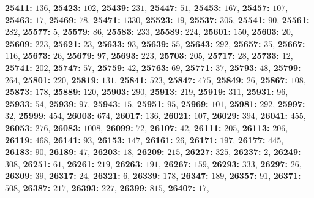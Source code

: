 \textsf{\bfseries 25411:} $136$, \textsf{\bfseries 25423:} $102$, \textsf{\bfseries 25439:} $231$, \textsf{\bfseries 25447:} $51$, \textsf{\bfseries 25453:} $167$, \textsf{\bfseries 25457:} $107$, \textsf{\bfseries 25463:} $17$, \textsf{\bfseries 25469:} $78$, \textsf{\bfseries 25471:} $1330$, \textsf{\bfseries 25523:} $19$, \textsf{\bfseries 25537:} $305$, \textsf{\bfseries 25541:} $90$, \textsf{\bfseries 25561:} $282$, \textsf{\bfseries 25577:} $5$, \textsf{\bfseries 25579:} $86$, \textsf{\bfseries 25583:} $233$, \textsf{\bfseries 25589:} $224$, \textsf{\bfseries 25601:} $150$, \textsf{\bfseries 25603:} $20$, \textsf{\bfseries 25609:} $223$, \textsf{\bfseries 25621:} $23$, \textsf{\bfseries 25633:} $93$, \textsf{\bfseries 25639:} $55$, \textsf{\bfseries 25643:} $292$, \textsf{\bfseries 25657:} $35$, \textsf{\bfseries 25667:} $116$, \textsf{\bfseries 25673:} $26$, \textsf{\bfseries 25679:} $97$, \textsf{\bfseries 25693:} $223$, \textsf{\bfseries 25703:} $205$, \textsf{\bfseries 25717:} $28$, \textsf{\bfseries 25733:} $12$, \textsf{\bfseries 25741:} $202$, \textsf{\bfseries 25747:} $57$, \textsf{\bfseries 25759:} $42$, \textsf{\bfseries 25763:} $69$, \textsf{\bfseries 25771:} $37$, \textsf{\bfseries 25793:} $48$, \textsf{\bfseries 25799:} $264$, \textsf{\bfseries 25801:} $220$, \textsf{\bfseries 25819:} $131$, \textsf{\bfseries 25841:} $523$, \textsf{\bfseries 25847:} $475$, \textsf{\bfseries 25849:} $26$, \textsf{\bfseries 25867:} $108$, \textsf{\bfseries 25873:} $178$, \textsf{\bfseries 25889:} $120$, \textsf{\bfseries 25903:} $290$, \textsf{\bfseries 25913:} $219$, \textsf{\bfseries 25919:} $311$, \textsf{\bfseries 25931:} $96$, \textsf{\bfseries 25933:} $54$, \textsf{\bfseries 25939:} $97$, \textsf{\bfseries 25943:} $15$, \textsf{\bfseries 25951:} $95$, \textsf{\bfseries 25969:} $101$, \textsf{\bfseries 25981:} $292$, \textsf{\bfseries 25997:} $32$, \textsf{\bfseries 25999:} $454$, \textsf{\bfseries 26003:} $674$, \textsf{\bfseries 26017:} $136$, \textsf{\bfseries 26021:} $107$, \textsf{\bfseries 26029:} $394$, \textsf{\bfseries 26041:} $455$, \textsf{\bfseries 26053:} $276$, \textsf{\bfseries 26083:} $1008$, \textsf{\bfseries 26099:} $72$, \textsf{\bfseries 26107:} $42$, \textsf{\bfseries 26111:} $205$, \textsf{\bfseries 26113:} $206$, \textsf{\bfseries 26119:} $468$, \textsf{\bfseries 26141:} $93$, \textsf{\bfseries 26153:} $147$, \textsf{\bfseries 26161:} $26$, \textsf{\bfseries 26171:} $197$, \textsf{\bfseries 26177:} $445$, \textsf{\bfseries 26183:} $90$, \textsf{\bfseries 26189:} $47$, \textsf{\bfseries 26203:} $18$, \textsf{\bfseries 26209:} $215$, \textsf{\bfseries 26227:} $325$, \textsf{\bfseries 26237:} $2$, \textsf{\bfseries 26249:} $308$, \textsf{\bfseries 26251:} $61$, \textsf{\bfseries 26261:} $219$, \textsf{\bfseries 26263:} $191$, \textsf{\bfseries 26267:} $159$, \textsf{\bfseries 26293:} $333$, \textsf{\bfseries 26297:} $26$, \textsf{\bfseries 26309:} $39$, \textsf{\bfseries 26317:} $24$, \textsf{\bfseries 26321:} $6$, \textsf{\bfseries 26339:} $178$, \textsf{\bfseries 26347:} $189$, \textsf{\bfseries 26357:} $91$, \textsf{\bfseries 26371:} $508$, \textsf{\bfseries 26387:} $217$, \textsf{\bfseries 26393:} $227$, \textsf{\bfseries 26399:} $815$, \textsf{\bfseries 26407:} $17$, 
